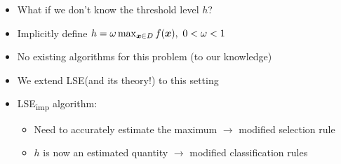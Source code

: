 \documentclass[10pt,mathserif]{beamer}
\newcommand{\acl}{\textsf{LSE}\xspace}
\newcommand{\iacl}{\textsf{LSE\textsubscript{imp}}\xspace}
\begin{document}
\begin{frame}
\begin{itemize}
\item<1-> What if we don't know the threshold level $h$?
\vspace{1em}
\item<2-> Implicitly define $h = \omega \max_{\bm{x}\in D} f(\bm{x}),\ 0 < \omega < 1$
\vspace{1em}
\item<3-> No existing algorithms for this problem (to our knowledge)
\vspace{1em}
\item<4-> We extend \acl (and its theory!) to this setting
\vspace{1em}
\item<5->\iacl algorithm:
\begin{itemize}
\item<6-> Need to accurately estimate the maximum $\rightarrow$ modified selection rule
\item<7-> $h$ is now an estimated quantity $\rightarrow$ modified classification rules
\end{itemize}
\end{itemize}
\begin{center}
\end{center}
\end{frame}
\end{document}
